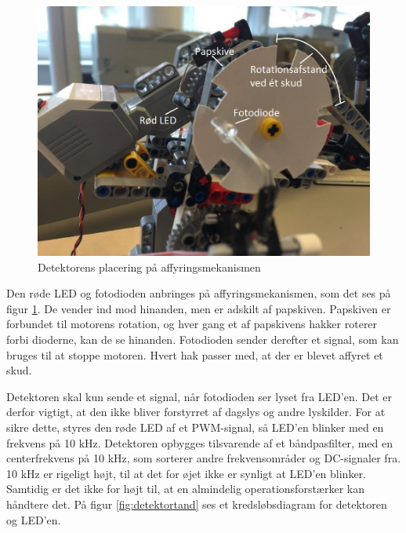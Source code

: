 \begin{figure}[H]
	\centering
	\includegraphics[width=\textwidth]{Afsnit/DesignOgImplementering/images/detektor}
	\caption{Detektorens placering på affyringsmekanismen}
	\label{fig:detektor}
\end{figure}

Den røde LED og fotodioden anbringes på affyringsmekanismen, som det ses på figur \ref{fig:detektor}. De vender ind mod hinanden, men er adskilt af papskiven. Papskiven er forbundet til motorens rotation, og hver gang et af papskivens hakker roterer forbi dioderne, kan de se hinanden. Fotodioden sender derefter et signal, som kan bruges til at stoppe motoren. Hvert hak passer med, at der er blevet affyret et skud.  

Detektoren skal kun sende et signal, når fotodioden ser lyset fra LED'en. Det er derfor vigtigt, at den ikke bliver forstyrret af dagslys og andre lyskilder. For at sikre dette, styres den røde LED af et PWM-signal, så LED'en blinker med en frekvens på 10 kHz. Detektoren opbygges tilsvarende af et båndpasfilter, med en centerfrekvens på 10 kHz, som sorterer andre frekvensområder og DC-signaler fra. 10 kHz er rigeligt højt, til at det for øjet ikke er synligt at LED'en blinker. Samtidig er det ikke for højt til, at en almindelig operationsforstærker kan håndtere det. På figur \ref*{fig:detektortand} ses et kredsløbsdiagram for detektoren og LED'en.

